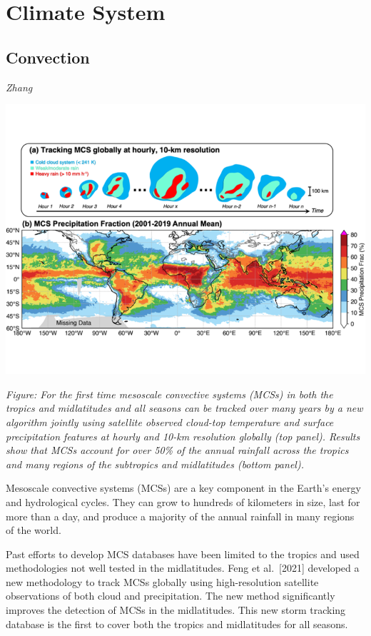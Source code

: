 \documentclass[
]{book}
\begin{document}
\hypertarget{climate-system}{%
\chapter{Climate System}\label{climate-system}}

\hypertarget{convection}{%
\section{Convection}\label{convection}}

\emph{Zhang}

\includegraphics{fig/mesoscale_convection.png}

\emph{Figure: For the first time mesoscale convective systems (MCSs) in both the tropics and midlatitudes and all seasons can be tracked over many years by a new algorithm jointly using satellite observed cloud-top temperature and surface precipitation features at hourly and 10-km resolution globally (top panel). Results show that MCSs account for over 50\% of the annual rainfall across the tropics and many regions of the subtropics and midlatitudes (bottom panel).}

Mesoscale convective systems (MCSs) are a key component in the Earth's energy and hydrological cycles. They can grow to hundreds of kilometers in size, last for more than a day, and produce a majority of the annual rainfall in many regions of the world.

Past efforts to develop MCS databases have been limited to the tropics and used methodologies not well tested in the midlatitudes. Feng et al.~{[}2021{]} developed a new methodology to track MCSs globally using high-resolution satellite observations of both cloud and precipitation. The new method significantly improves the detection of MCSs in the midlatitudes. This new storm tracking database is the first to cover both the tropics and midlatitudes for all seasons.
\end{document}
